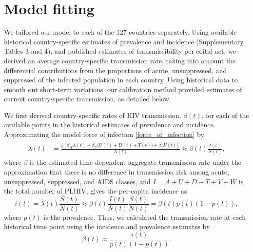 \documentclass{article}
\begin{document}
\section{Model fitting}
\label{model_fitting}

We tailored our model to each of the 127 countries separately.  Using
available historical country-specific estimates of prevalence and
incidence (Supplementary Tables 3 and 4), and published estimates of
transmissibility per coital
act,\cite{Wawer2005-us, Donnell2010-xo, Hughes2012-so,
  Skarbinski2015-ni}
we derived an average country-specific transmission rate, taking into
account the differential contributions from the proportions of acute,
unsuppressed, and suppressed of the infected population in each
country.  Using historical data to smooth out short-term variations,
our calibration method provided estimates of current country-specific
transmission, as detailed below.

We first derived country-specific rates of HIV transmission,
$\beta(t)$, for each of the available points in the historical
estimates of prevalence and incidence.  Approximating the model
force of infection \eqref{force_of_infection} by
\begin{align}
  \label{foi}
  \begin{split}
    \lambda(t) &= \frac{\xi \left[\beta_{A} A(t)
        + \beta_{U} \big(U(t) + D(t) + T(t)\big) +
        \beta_{V} V(t)\right]}{N(t)}
    \approx  \beta(t) \frac{I(t)}{N(t)},
  \end{split}
\end{align}
where $\beta$ is the estimated time-dependent aggregate transmission
rate under the approximation that there is no difference in
transmission risk among acute, unsuppressed, suppressed, and AIDS
classes, and $I = A + U + D + T + V + W$ is the total number of PLHIV,
gives the per-capita incidence as
\begin{equation}
i(t) = \lambda(t) \frac{S(t)}{N(t)}
\approx \beta(t) \frac{I(t)}{N(t)} \frac{S(t)}{N(t)} =\beta(t) p(t) (1-p(t)),
\end{equation}
where $p(t)$ is the prevalence. Thus, we calculated the transmission
rate at each historical time point using the incidence and prevalence
estimates by
\begin{equation}
  \label{trans_rate}
  \beta(t) \approx \frac{i(t)}{p(t)(1-p(t))}.
\end{equation}
\end{document}
